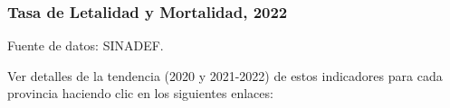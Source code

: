\documentclass[xcolor=table]{beamer}
\begin{document}
	\begin{frame}[label=indicadores_provinciales]
		\frametitle{Tasa de Letalidad y Mortalidad, 2022}
		\vspace{-.5cm}
		
		\begin{table}[]
			\resizebox{\textwidth}{!}{%
				
			}
		\end{table}
		{\tiny Fuente de datos: SINADEF. \hyperlink{indice}{} \\} 
		
		Ver detalles de la tendencia (2020 y 2021-2022) de estos indicadores para cada provincia haciendo clic en los siguientes enlaces:\\ \hyperlink{Acomayo}{} \hyperlink{Anta}{} \hyperlink{Calca}{} \hyperlink{Canas}{} \hyperlink{Chumbivilcas}{}
		\hyperlink{Canchis}{} \hyperlink{Cusco}{}
		\hyperlink{Espinar}{}
		\hyperlink{laconvencion}{}
		\hyperlink{Paruro}{} \hyperlink{Paucartambo}{}	
		\hyperlink{Quispicanchi}{}
		\hyperlink{Urubamba}{}
	\end{frame}

\end{document}
